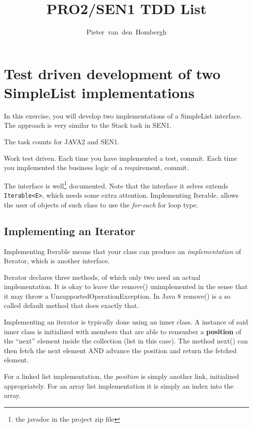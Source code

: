 \documentclass[twocolumn,a4paper]{article}
\title{PRO2/SEN1 TDD List}
\author{Pieter~van~den~Hombergh}
\providecommand\Code[1]{{\color{fontys}\ttfamily#1}}
\begin{document}
\maketitle

\section*{Test driven development of two SimpleList implementations}

In this exercise, you will develop two implementations of a SimpleList
interface. The approach is very similar to the Stack task in SEN1.

The task counts for JAVA2 and SEN1.

Work test driven. Each time you have implemented a test, commit. Each
time you implemented the business logic of a requirement, commit.

The interface is well\footnote{the javadoc in the project zip file} documented. Note that the interface it selves
extends \lstinline{Iterable<E>}, which needs some extra attention.
Implementing Iterable, allows the user of objects of such class to use
the \textit{for-each} for loop type.



\subsection*{Implementing an Iterator}
Implementing \Code{Iterable} means that your class can produce an
\textit{implementation} of \Code{Iterator}, which is another interface.

Iterator declares three methods, of which only two need an actual
implementation. It is okay to leave the \Code{remove()} unimplemented
in the sense that it may throw a
\Code{UnsupportedOperationException}. In Java 8 \Code{remove()} is a so called
default method that does exactly that.

Implementing an iterator is typically done using an inner class.
A instance of said inner class is initialized with members that are able to
remember a \textbf{position} of the ``next'' element inside the
collection (list in this case). The method \Code{next()} can then
fetch the next element AND advance the position and return the fetched
element. 

For a linked list implementation, the \textit{position} is simply another link,
initialized appropriately. For an array list implementation it is
simply an index into the array.
\end{document}
